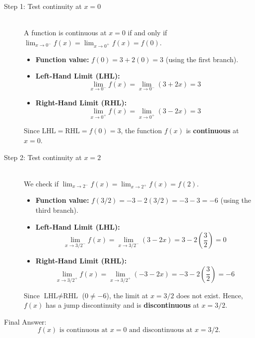 \documentclass[11pt, a4paper]{article}
\begin{document}
\begin{description}
    \item[Step 1: Test continuity at $x = 0$] \ \\
    A function is continuous at $x = 0$ if and only if $\lim_{x \to 0^-} f(x) = \lim_{x \to 0^+} f(x) = f(0)$.
    \begin{itemize}
        \item \textbf{Function value:} $f(0) = 3 + 2(0) = 3$ (using the first branch).
        \item \textbf{Left-Hand Limit (LHL):}
        \[ \lim_{x \to 0^-} f(x) = \lim_{x \to 0^-} (3 + 2x) = 3 \]
        \item \textbf{Right-Hand Limit (RHL):}
        \[ \lim_{x \to 0^+} f(x) = \lim_{x \to 0^+} (3 - 2x) = 3 \]
    \end{itemize}
    Since $\text{LHL} = \text{RHL} = f(0) = 3$, the function $f(x)$ is \textbf{continuous} at $x = 0$.

    \item[Step 2: Test continuity at $x = 2$] \ \\
    We check if $\lim_{x \to 2^-} f(x) = \lim_{x \to 2^+} f(x) = f(2)$.
    \begin{itemize}
        \item \textbf{Function value:} $f(3/2) = -3 - 2(3/2) = -3 - 3 = -6$ (using the third branch).
        \item \textbf{Left-Hand Limit (LHL):}
        \[ \lim_{x \to 3/2^-} f(x) = \lim_{x \to 3/2^-} (3 - 2x) = 3 - 2\left(\frac{3}{2}\right) = 0 \]
        \item \textbf{Right-Hand Limit (RHL):}
        \[ \lim_{x \to 3/2^+} f(x) = \lim_{x \to 3/2^+} (-3 - 2x) = -3 - 2\left(\frac{3}{2}\right) = -6 \]
    \end{itemize}
    Since $\text{LHL} \neq \text{RHL}$ ($0 \neq -6$), the limit at $x = 3/2$ does not exist. Hence, $f(x)$ has a jump discontinuity and is \textbf{discontinuous} at $x = 3/2$.
\end{description}

Final Answer:
\[ 
\boxed{f(x) \text{ is continuous at } x = 0 \text{ and discontinuous at } x = 3/2.} 
\]


\end{document}
